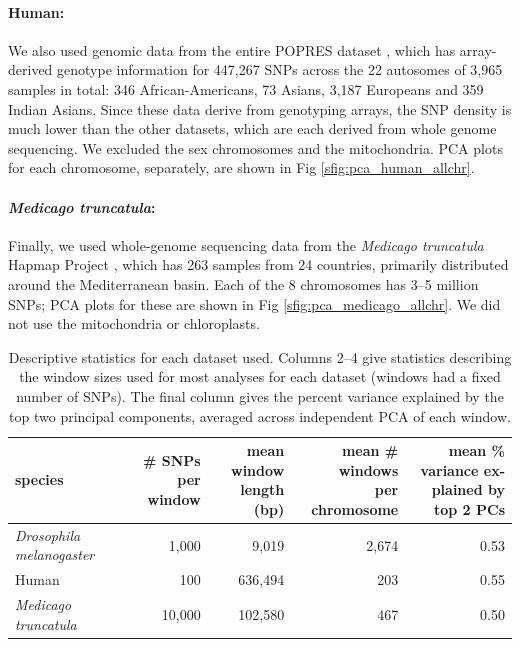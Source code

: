 \documentclass[11pt, oneside]{article}   	%
\newcommand\citep{\cite}
\newcommand{\Figure}{Fig }
\newcommand{\Figure}{{Figure }}
\begin{document}
\paragraph{Human:}
We also used genomic data from the entire POPRES dataset \citep{nelson2008population},
which has array-derived genotype information for 447,267 SNPs across the 22 autosomes
of 3,965 samples in total: 346 African-Americans, 73 Asians, 3,187 Europeans and 359 Indian Asians.
Since these data derive from genotyping arrays, the SNP density is much lower than the other datasets,
which are each derived from whole genome sequencing.
We excluded the sex chromosomes and the mitochondria.
PCA plots for each chromosome, separately, are shown in \Figure \ref{sfig:pca_human_allchr}.


\paragraph{\textit{Medicago truncatula}:}
Finally, we used whole-genome sequencing data from the \textit{Medicago truncatula} Hapmap Project \citep{tang2014improved},
which has 263 samples from 24 countries,
primarily distributed around the Mediterranean basin.
Each of the 8 chromosomes has 3--5 million SNPs;
PCA plots for these are shown in \Figure \ref{sfig:pca_medicago_allchr}.
We did not use the mitochondria or chloroplasts.

\begin{table}[ht]
\centering
    \begin{tabular}{p{0.8in}rrrr}
  \hline
    species 
    & \parbox[t]{.8in}{\# SNPs per \\ window} 
    & \parbox[t]{1in}{mean window\\ length (bp)}
    & \parbox[t]{1.2in}{mean \# windows \\ per chromosome} 
    & \parbox[t]{1.4in}{mean \% variance ex-\\plained by top 2 PCs} \\ 
  \hline
  \textit{Drosophila melanogaster} & 1,000 & 9,019 & 2,674 & 0.53 \\ 
  Human & 100 & 636,494 & 203 & 0.55 \\ 
  \textit{Medicago truncatula} & 10,000 & 102,580 & 467 & 0.50 \\ 
   \hline
\end{tabular}
\caption{
    Descriptive statistics for each dataset used.
    Columns 2--4 give statistics describing the window sizes used for most analyses for each dataset
    (windows had a fixed number of SNPs).
    The final column gives the percent variance explained by the top two principal components,
    averaged across independent PCA of each window.
    \label{tab:data_stats}
}
\end{table}
\end{document}
